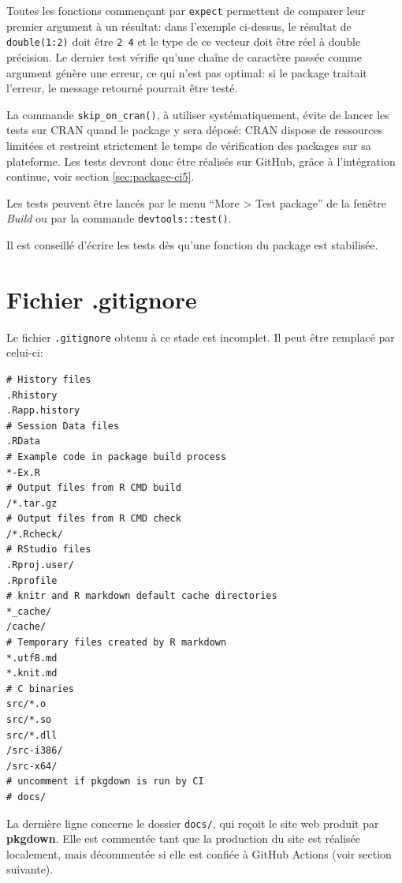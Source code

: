 \documentclass[
  12pt,
  french,
  a4paper,
  extrafontsizes,onecolumn,openright
  ]{memoir}
\begin{document}
\normalsize

Toutes les fonctions commençant par \texttt{expect} permettent de comparer leur premier argument à un résultat: dans l'exemple ci-dessus, le résultat de \texttt{double(1:2)} doit être \texttt{2\ 4} et le type de ce vecteur doit être réel à double précision.
Le dernier test vérifie qu'une chaîne de caractère passée comme argument génère une erreur, ce qui n'est pas optimal: si le package traitait l'erreur, le message retourné pourrait être testé.

La commande \texttt{skip\_on\_cran()}, à utiliser systématiquement, évite de lancer les tests sur CRAN quand le package y sera déposé: CRAN dispose de ressources limitées et restreint strictement le temps de vérification des packages sur sa plateforme.
Les tests devront donc être réalisés sur GitHub, grâce à l'intégration continue, voir section \ref{sec:package-ci5}.

Les tests peuvent être lancés par le menu \enquote{More \textgreater{} Test package} de la fenêtre \emph{Build} ou par la commande \texttt{devtools::test()}.

Il est conseillé d'écrire les tests dès qu'une fonction du package est stabilisée.

\hypertarget{fichier-.gitignore}{%
\section{Fichier .gitignore}\label{fichier-.gitignore}}

Le fichier \texttt{.gitignore} obtenu à ce stade est incomplet.
Il peut être remplacé par celui-ci:

\begin{verbatim}
# History files
.Rhistory
.Rapp.history
# Session Data files
.RData
# Example code in package build process
*-Ex.R
# Output files from R CMD build
/*.tar.gz
# Output files from R CMD check
/*.Rcheck/
# RStudio files
.Rproj.user/
.Rprofile
# knitr and R markdown default cache directories
*_cache/
/cache/
# Temporary files created by R markdown
*.utf8.md
*.knit.md
# C binaries
src/*.o
src/*.so
src/*.dll
/src-i386/
/src-x64/
# uncomment if pkgdown is run by CI
# docs/
\end{verbatim}

La dernière ligne concerne le dossier \texttt{docs/}, qui reçoit le site web produit par \textbf{pkgdown}.
Elle est commentée tant que la production du site est réalisée localement, mais décommentée si elle est confiée à GitHub Actions (voir section suivante).
\end{document}
